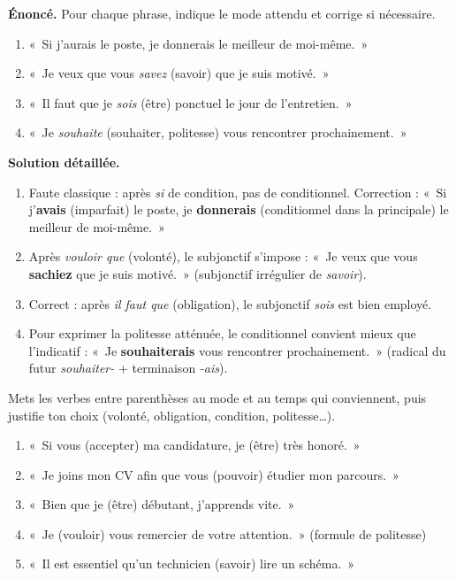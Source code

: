 \documentclass[11pt]{article}
\begin{document}
\begin{exoresolu}
\textbf{Énoncé.} Pour chaque phrase, indique le mode attendu et corrige si nécessaire.
\begin{enumerate}
\item «~Si j'aurais le poste, je donnerais le meilleur de moi-même.~»
\item «~Je veux que vous \emph{savez} (savoir) que je suis motivé.~»
\item «~Il faut que je \emph{sois} (être) ponctuel le jour de l'entretien.~»
\item «~Je \emph{souhaite} (souhaiter, politesse) vous rencontrer prochainement.~»
\end{enumerate}
\tcblower
\textbf{Solution détaillée.}
\begin{enumerate}
\item Faute classique : après \emph{si} de condition, pas de conditionnel. Correction : «~Si j'\textbf{avais} (imparfait) le poste, je \textbf{donnerais} (conditionnel dans la principale) le meilleur de moi-même.~»
\item Après \emph{vouloir que} (volonté), le subjonctif s'impose : «~Je veux que vous \textbf{sachiez} que je suis motivé.~» (subjonctif irrégulier de \emph{savoir}).
\item Correct : après \emph{il faut que} (obligation), le subjonctif \emph{sois} est bien employé.
\item Pour exprimer la politesse atténuée, le conditionnel convient mieux que l'indicatif : «~Je \textbf{souhaiterais} vous rencontrer prochainement.~» (radical du futur \emph{souhaiter-} + terminaison \emph{-ais}).
\end{enumerate}
\end{exoresolu}

\begin{exercice}
Mets les verbes entre parenthèses au mode et au temps qui conviennent, puis justifie ton choix (volonté, obligation, condition, politesse\ldots).
\begin{enumerate}
\item «~Si vous (accepter) ma candidature, je (être) très honoré.~»
\item «~Je joins mon CV afin que vous (pouvoir) étudier mon parcours.~»
\item «~Bien que je (être) débutant, j'apprends vite.~»
\item «~Je (vouloir) vous remercier de votre attention.~» (formule de politesse)
\item «~Il est essentiel qu'un technicien (savoir) lire un schéma.~»
\end{enumerate}
\end{exercice}
\end{document}
